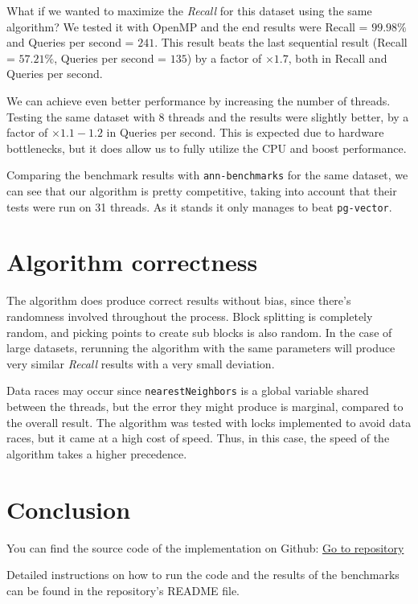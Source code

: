 \documentclass{article}
\begin{document}
What if we wanted to maximize the \emph{Recall} for this dataset using the same algorithm?
We tested it with OpenMP and the end results were Recall = $99.98\%$ and Queries per second = $241$.
This result beats the last sequential result (Recall = $57.21\%$, Queries per second = $135$) by a factor of $\times1.7$, 
both in Recall and Queries per second.

We can achieve even better performance by increasing the number of threads. Testing the same dataset with 8 threads and the
results were slightly better, by a factor of $\times1.1-1.2$ in Queries per second. This is expected due to hardware
bottlenecks, but it does allow us to fully utilize the CPU and boost performance.

Comparing the benchmark results with \texttt{ann-benchmarks} for the same dataset, 
we can see that our algorithm
is pretty competitive, taking into account that their tests were run on 31 threads. 
As it stands it only manages to beat \texttt{pg-vector}.

\section{Algorithm correctness}
The algorithm does produce correct results without bias, since there's randomness involved throughout the process.
Block splitting is completely random, and picking points to create sub blocks is also random. In the case of large datasets, rerunning the
algorithm with the same parameters will produce very similar \emph{Recall} results with a very small deviation.

Data races may occur since \texttt{nearestNeighbors} is a global variable shared between the threads, but the error they might produce 
is marginal, compared to the overall result. The algorithm was tested with locks implemented to avoid data races, but it came at 
a high cost of speed. Thus, in this case, the speed of the algorithm takes a higher precedence.

\section{Conclusion}
You can find the source code of the implementation on Github: 
\href{https://github.com/NontasBak/auth-parallel-ex1}{Go to repository}

Detailed instructions on how to run the code and the results of the benchmarks can be found in the repository's README file.
\end{document}
